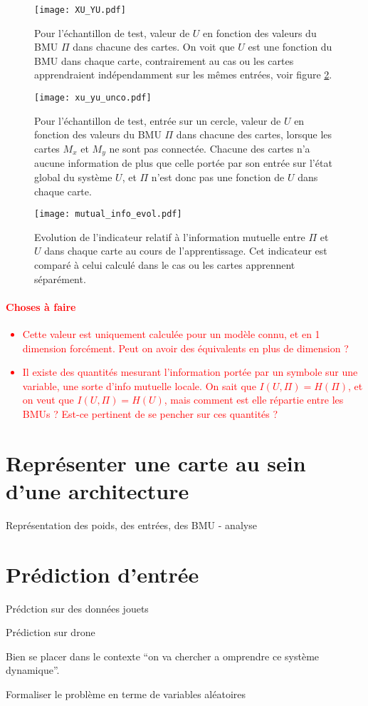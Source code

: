 \begin{figure}
\centering
\texttt{[image: XU\_YU.pdf]}
\caption{Pour l'échantillon de test, valeur de $U$ en fonction des valeurs du BMU $\Pi$ dans chacune des cartes. On voit que $U$ est une fonction du BMU dans chaque carte, contrairement au cas ou les cartes apprendraient indépendamment sur les mêmes entrées, voir figure \ref{fig:piu_indep}.}
\label{fig:piu}
\end{figure}

\begin{figure}
\centering
\texttt{[image: xu\_yu\_unco.pdf]}
\caption{Pour l'échantillon de test, entrée sur un cercle, valeur de $U$ en fonction des valeurs du BMU $\Pi$ dans chacune des cartes, lorsque les cartes $M_x$ et $M_y$ ne sont pas connectée. Chacune des cartes n'a aucune information de plus que celle portée par son entrée sur l'état global du système $U$, et $\Pi$ n'est donc pas une fonction de $U$ dans chaque carte. }
\label{fig:piu_indep}
\end{figure}

\begin{figure}
\centering
\texttt{[image: mutual\_info\_evol.pdf]}
\caption{Evolution de l'indicateur relatif à l'information mutuelle entre $\Pi$ et $U$ dans chaque carte au cours de l'apprentissage. Cet indicateur est comparé à celui calculé dans le cas ou les cartes apprennent séparément.}
\label{fig:im} 
\end{figure}

\textcolor{red}{
\paragraph{Choses à faire}
\begin{itemize}
\item Cette valeur est uniquement calculée pour un modèle connu, et en 1 dimension forcément. Peut on avoir des équivalents en plus de dimension ? 
\item Il existe des quantités mesurant l'information portée par un symbole sur une variable, une sorte d'info mutuelle locale. On sait que $I(U,\Pi) = H(\Pi)$, et on veut que $I(U,\Pi) = H(U)$, mais comment est elle répartie entre les BMUs ? Est-ce pertinent de se pencher sur ces quantités ? 
\end{itemize}
}


\section{Représenter une carte au sein d'une architecture}

Représentation des poids, des entrées, des BMU - analyse

\section{Prédiction d'entrée}

Prédction sur des données jouets

Prédiction sur drone



Bien se placer dans le contexte “on va chercher a omprendre ce système dynamique”.

Formaliser le problème en terme de variables aléatoires